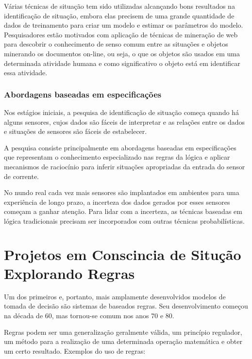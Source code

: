 \documentclass[12pt,a4paper,compsoc]{IEEEtran}
\begin{document}
  Várias técnicas de situação tem sido utilizadas alcançando bons resultados na identificação de
  situação, embora elas precisem de uma grande quantidade de dados de treinamento para criar um
  modelo e estimar os parâmetros do modelo. Pesquisadores estão motivados com aplicação de técnicas
  de mineração de web para descobrir o conhecimento de senso comum entre as situações e objetos
  minerando os documentos on-line, ou seja, o que os objetos são usados em uma determinada 
  atividade humana e como significativo o objeto está em identificar essa atividade.


\subsubsection{Abordagens baseadas em especificações}

  Nos estágios iniciais, a pesquisa de identificação de situação começa quando há alguns sensores,
  cujos dados são fáceis de interpretar e as relações entre os dados e situações de sensores são 
  fáceis de estabelecer.
  
  A pesquisa consiste principalmente em abordagens baseadas em especificações que representam o
  conhecimento especializado nas regras da lógica e aplicar mecanismos de raciocínio para inferir
  situações apropriadas da entrada do sensor de corrente.
  
  No nundo real cada vez mais sensores são implantados em ambientes para uma experiência de longo
  prazo, a incerteza dos dados gerados por esses sensores  começam a ganhar atenção. Para lidar com
  a incerteza, as técnicas baseadas em lógica tradicionais precisam ser incorporados com outras
  técnicas probabilísticas.


\section{Projetos em Conscincia de Situção Explorando Regras}

  Um dos primeiros e, portanto, mais amplamente desenvolvidos modelos de tomada de decisão são
  sistemas de baseados regras. Seu  desenvolvimento começou na década de 60, mas tornou-se comum
  nos anos 70 e 80.
  
  Regras podem ser  uma generalização geralmente válida, um princípio regulador, um método para a
  realização de uma determinada operação matemática e obter um certo resultado. Exemplos do uso de
  regras:
  
\end{document}
